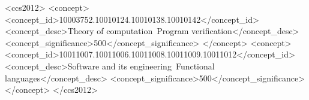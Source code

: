 \documentclass[sigplan, review]{acmart}\settopmatter{printfolios=true}
\begin{document}
\begin{CCSXML}
<ccs2012>
<concept>
<concept_id>10003752.10010124.10010138.10010142</concept_id>
<concept_desc>Theory of computation~Program verification</concept_desc>
<concept_significance>500</concept_significance>
</concept>
<concept>
<concept_id>10011007.10011006.10011008.10011009.10011012</concept_id>
<concept_desc>Software and its engineering~Functional languages</concept_desc>
<concept_significance>500</concept_significance>
</concept>
</ccs2012>
\end{CCSXML}





\maketitle



%
\end{document}
